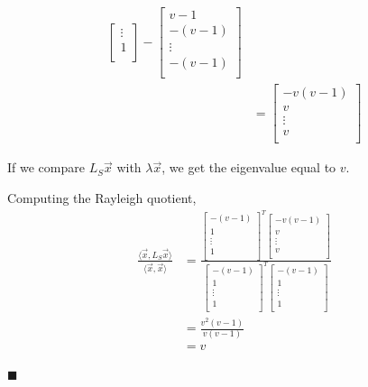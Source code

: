 \documentclass[12pt,a4paper]{article}
\newcommand{\rightqed}{
\begin{flushright}
$\blacksquare$
\end{flushright}
}
\begin{document}
\begin{align*}
\begin{bmatrix}
                  \vdots \\
                  1 \\
                  \end{bmatrix} - \begin{bmatrix}
                  v-1 \\
                  -(v-1) \\
                  \vdots \\
                  -(v-1)  \\
                  \end{bmatrix} \\
              &= \begin{bmatrix}
                  -v(v-1) \\
                  v \\
                  \vdots \\
                  v \\
                  \end{bmatrix}
\end{align*}

If we compare $L_S\vec{x}$ with $\lambda\vec{x}$, we get the eigenvalue equal to $v$.

Computing the Rayleigh quotient,
\begin{align*}
    \frac{\langle \vec{x}, L_S\vec{x} \rangle}{\langle \vec{x}, \vec{x} \rangle} &= \frac{\begin{bmatrix}
                  -(v-1) \\
                  1 \\
                  \vdots \\
                  1 \\
                  \end{bmatrix}^T\begin{bmatrix}
                  -v(v-1) \\
                  v \\
                  \vdots \\
                  v \\
                  \end{bmatrix}}{
                  \begin{bmatrix}
                  -(v-1) \\
                  1 \\
                  \vdots \\
                  1 \\
                  \end{bmatrix}^T\begin{bmatrix}
                  -(v-1) \\
                  1 \\
                  \vdots \\
                  1 \\
                  \end{bmatrix}} \\
            &= \frac{v^2(v-1)}{v(v-1)} \\
            &= v
\end{align*}
\rightqed
\end{document}
